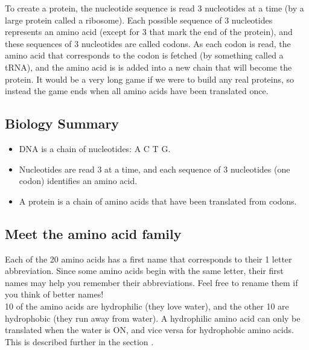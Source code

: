 \documentclass[a4paper,11pt,oneside]{memoir}
\begin{document}
To create a protein, the nucleotide sequence is read 3 nucleotides at a time (by a large protein called a ribosome).
Each possible sequence of 3 nucleotides represents an amino acid (except for 3 that mark the end of the protein), and these sequences of 3 nucleotides are called codons.
As each codon is read, the amino acid that corresponds to the codon is fetched (by something called a tRNA), and the amino acid is is added into a new chain that will become the protein.
It would be a very long game if we were to build any real proteins, so instead the game ends when all amino acids have been translated once.

\subsection*{Biology Summary}
\begin{itemize}
    \item DNA is a chain of nucleotides: A C T G.
    \item Nucleotides are read 3 at a time, and each sequence of 3 nucleotides (one codon) identifies an amino acid.
    \item A protein is a chain of amino acids that have been translated from codons.
\end{itemize}



\subsection*{Meet the amino acid family}

Each of the 20 amino acids has a first name that corresponds to their 1 letter abbreviation.  
Since some amino acids begin with the same letter, their first names may help you remember their abbreviations.
Feel free to rename them if you think of better names! \\

10 of the amino acids are hydrophilic (they love water), and the other 10 are hydrophobic (they run away from water). 
A hydrophilic amino acid can only be translated when the water is ON, and vice versa for hydrophobic amino acids.  
This is described further in the section \textbf{}.\\
\end{document}

